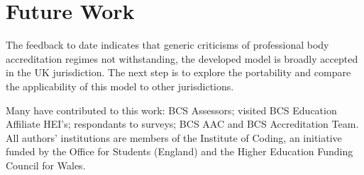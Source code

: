 \documentclass[sigconf]{acmart}
\begin{document}
\begin{comment}
\begin{compactitem}
	\item {Raising output standards, essentially performing a
		kite-marking function.}
	\item {Employ internationally-recognised standards and
		memoranda (e.g. Seoul Accord, Washington Accord, EQANIE) to
		promote the global parity of computer science education and hence the
		mobility of graduates.}
	\item {Ensuring curricula relevance e.g. coverage of
		cybersecurity~\cite{Cricketal2019}, team working and professional
		environment}
	\item {Identifying and disseminating practice highlights
		either directly \cite{practice_highlights_2020} or via other means
		such as conferences (e.g. ACM CEP Conference~\cite{CrickEtAl2020Cep}} )
	\item {Industry relevance by mandating the inclusion of
		industrialist upon accreditation panels}
	\item {Accrediting work experience in degree programmes.}
\end{compactitem}

\end{comment}

\section*{Future Work}

The feedback to date indicates that generic criticisms of professional
body accreditation regimes not withstanding, the developed model is
broadly accepted in the UK jurisdiction. The next step is to explore
the portability and compare the applicability of this model to other
jurisdictions.

\begin{acks}
Many have contributed to this work: BCS Assessors; visited BCS Education Affiliate HEI's; respondants to surveys; BCS AAC and BCS Accreditation Team.
All authors' institutions are members of the Institute of Coding, an initiative funded by the Office for Students (England) and the Higher Education Funding Council for Wales.	
\end{acks}

%

\appendix
\end{document}
